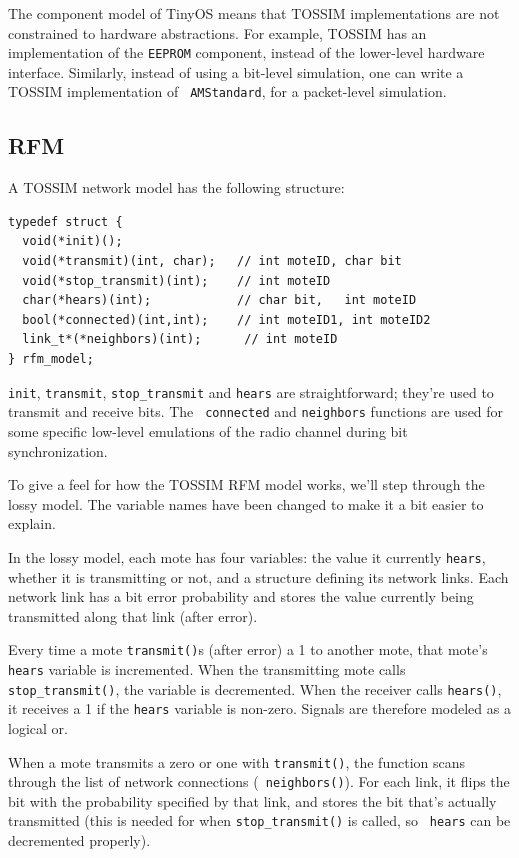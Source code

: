\documentclass[10pt,fleqn]{article}
\def\sim{TOSSIM\xspace}
\begin{document}
The component model of TinyOS means that \sim implementations are not
constrained to hardware abstractions. For example, \sim has an
implementation of the {\tt EEPROM} component, instead of the
lower-level hardware interface. Similarly, instead of using a
bit-level simulation, one can write a \sim implementation of {\tt
AMStandard}, for a packet-level simulation.

\subsection{RFM}

A \sim network model has the following structure:

\begin{verbatim}
typedef struct {
  void(*init)();
  void(*transmit)(int, char);   // int moteID, char bit
  void(*stop_transmit)(int);    // int moteID
  char(*hears)(int);            // char bit,   int moteID
  bool(*connected)(int,int);    // int moteID1, int moteID2
  link_t*(*neighbors)(int);      // int moteID
} rfm_model;
\end{verbatim}

{\tt init}, {\tt transmit}, {\tt stop\_transmit} and {\tt hears} are
straightforward; they're used to transmit and receive bits. The {\tt
connected} and {\tt neighbors} functions are used for some specific
low-level emulations of the radio channel during bit synchronization.

To give a feel for how the \sim RFM model works, we'll step through
the lossy model. The variable names have been changed to make it a bit
easier to explain.

In the lossy model, each mote has four variables: the value it
currently {\tt hears}, whether it is transmitting or not, and a
structure defining its network links. Each network link has a bit
error probability and stores the value currently being transmitted
along that link (after error).

Every time a mote {\tt transmit()}s (after error) a 1 to another mote,
that mote's {\tt hears} variable is incremented. When the transmitting
mote calls {\tt stop\_transmit()}, the variable is decremented. When
the receiver calls {\tt hears()}, it receives a 1 if the {\tt hears}
variable is non-zero. Signals are therefore modeled as a logical or.

When a mote transmits a zero or one with {\tt transmit()}, the
function scans through the list of network connections ({\tt
neighbors()}). For each link, it flips the bit with the probability
specified by that link, and stores the bit that's actually transmitted
(this is needed for when {\tt stop\_transmit()} is called, so {\tt
hears} can be decremented properly).
\end{document}
